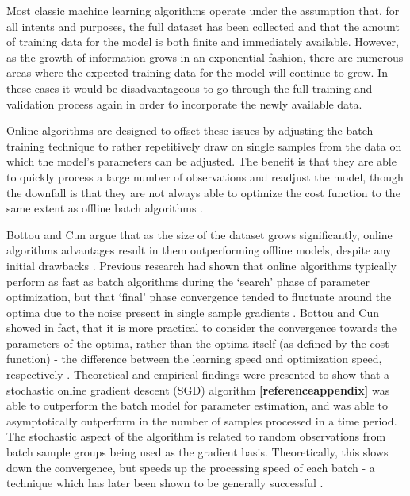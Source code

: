 \documentclass[a4paper,11pt,oneside]{article}
\theoremstyle{plain}
\theoremstyle{definition}
\begin{document}
Most classic machine learning algorithms operate under the assumption that, for all intents and purposes, the 
full dataset has been collected and that the amount of training data for the model is both finite and immediately 
available. However, as the growth of information grows in an exponential fashion, there are numerous areas where
 the expected training data for the model will continue to grow. In these cases it would be disadvantageous to go 
 through the full training and validation process again in order to incorporate the newly available data.
\hfill\break

Online algorithms are designed to offset these issues by adjusting the batch training technique to rather 
repetitively draw on single samples from the data on which the model’s parameters can be adjusted. The benefit 
is that they are able to quickly process a large number of observations and readjust the model, though the 
downfall is that they are not always able to optimize the cost function to the same extent as offline batch 
algorithms \cite{Albers}.
\hfill\break

Bottou and Cun argue that as the size of the dataset grows significantly, online algorithms advantages result in 
them outperforming offline models, despite any initial drawbacks \cite{Bottou}. Previous research had shown that online 
algorithms typically perform as fast as batch algorithms during the ‘search’ phase of parameter optimization, but 
that ‘final’ phase convergence tended to fluctuate around the optima due to the noise present in single sample 
gradients \cite{LeCun, Bottou2}. Bottou and Cun showed in fact, that it is more practical to consider the convergence towards
 the parameters of the optima, rather than the optima itself (as defined by the cost function) - the difference 
 between the learning speed and optimization speed, respectively \cite{Bottou}. Theoretical and empirical findings were 
 presented to show that a stochastic online gradient descent (SGD) algorithm \textbf{[referenceappendix] }was able to 
 outperform the batch model for parameter estimation, and was able to asymptotically outperform in the number of 
 samples processed in a time period. The stochastic aspect of the algorithm is related to random observations 
 from batch sample groups being used as the gradient basis. Theoretically, this slows down the convergence, but 
 speeds up the processing speed of each batch - a technique which has later been shown to be generally 
 successful \cite{Shalev, Zhang}. 
 \hfill\break
 
\end{document}
